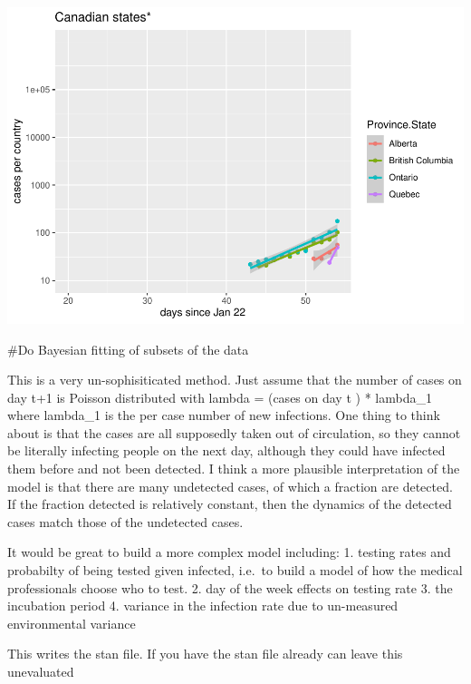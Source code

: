 \documentclass[]{article}
\begin{document}
\includegraphics{PlotData_files/figure-latex/PlotCanadianProvinces-1.pdf}

\#Do Bayesian fitting of subsets of the data

This is a very un-sophisiticated method. Just assume that the number of
cases on day t+1 is Poisson distributed with lambda = (cases on day t )
* lambda\_1 where lambda\_1 is the per case number of new infections.
One thing to think about is that the cases are all supposedly taken out
of circulation, so they cannot be literally infecting people on the next
day, although they could have infected them before and not been
detected. I think a more plausible interpretation of the model is that
there are many undetected cases, of which a fraction are detected. If
the fraction detected is relatively constant, then the dynamics of the
detected cases match those of the undetected cases.

It would be great to build a more complex model including: 1. testing
rates and probabilty of being tested given infected, i.e.~to build a
model of how the medical professionals choose who to test. 2. day of the
week effects on testing rate 3. the incubation period 4. variance in the
infection rate due to un-measured environmental variance

This writes the stan file. If you have the stan file already can leave
this unevaluated
\end{document}
